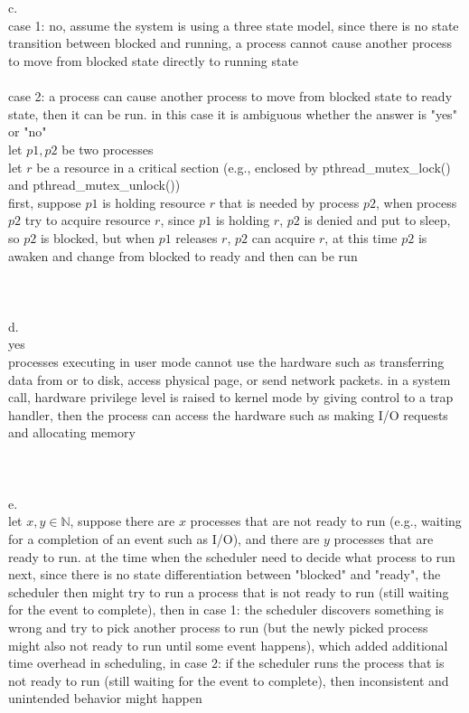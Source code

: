 \documentclass[12pt, border = 4pt, multi]{article} %
\begin{document}
\\
\\
c.\\
case 1: no, assume the system is using a three state model, since there is no state transition between blocked and running, a process cannot cause another process to move from blocked state directly to running state\\
\\
case 2: a process can cause another process to move from blocked state to ready state, then it can be run. in this case it is ambiguous whether the answer is "yes" or "no"\\
let $p1, p2$ be two processes\\
let $r$ be a resource in a critical section (e.g., enclosed by pthread\_mutex\_lock() and pthread\_mutex\_unlock())\\
first, suppose $p1$ is holding resource $r$ that is needed by process $p2$, when process $p2$ try to acquire resource $r$, since $p1$ is holding $r$, $p2$ is denied and put to sleep, so $p2$ is blocked, but when $p1$ releases $r$, $p2$ can acquire $r$, at this time $p2$ is awaken and change from blocked to ready and then can be run\\
\\
\\
\\
d.\\
yes\\
processes executing in user mode cannot use the hardware such as transferring data from or to disk, access physical page, or send network packets. in a system call, hardware privilege level is raised to kernel mode by giving control to a trap handler, then the process can access the hardware such as making I/O requests and allocating memory\\
\\
\\
\\
e.\\
let $x, y \in \mathbb{N}$, suppose there are $x$ processes that are not ready to run (e.g., waiting for a completion of an event such as I/O), and there are $y$ processes that are ready to run. at the time when the scheduler need to decide what process to run next, since there is no state differentiation between "blocked" and "ready", the scheduler then might try to run a process that is not ready to run (still waiting for the event to complete), then in case 1: the scheduler discovers something is wrong and try to pick another process to run (but the newly picked process might also not ready to run until some event happens), which added additional time overhead in scheduling, in case 2: if the scheduler runs the process that is not ready to run (still waiting for the event to complete), then inconsistent and unintended behavior might happen
\end{document}
